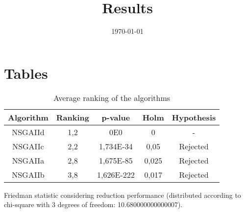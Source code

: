 \documentclass{article}
\title{Results}
\author{}
\date{\today}
\begin{document}
\oddsidemargin 0in \topmargin 0in\maketitle

\section{Tables}
\begin{table}[!htp]
\centering
\begin{tabular}{c|c|c|c|c}
Algorithm&Ranking&p-value&Holm&Hypothesis\\
\hline
NSGAIId & 1,2 & 0E0 & 0 & -\\
NSGAIIc & 2,2 & 1,734E-34 & 0,05 & Rejected\\
NSGAIIa & 2,8 & 1,675E-85 & 0,025 & Rejected\\
NSGAIIb & 3,8 & 1,626E-222 & 0,017 & Rejected\\
\end{tabular}
\caption{Average ranking of the algorithms}
\end{table}


Friedman statistic considering reduction performance (distributed according to chi-square with 3 degrees of freedom: 10.680000000000007).
\end{document}

